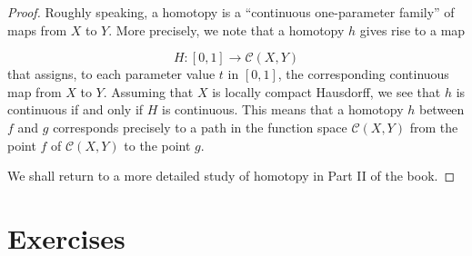 \begin{proof}
Roughly speaking, a homotopy is a ``continuous one-parameter family'' of maps from \(X\) to \(Y\). More precisely, we note that a homotopy \(h\) gives rise to a map

\[
H : [ {0,1}] \rightarrow \mathcal{C}({X,Y})
\]
that assigns, to each parameter value \(t\) in \([ {0,1}]\), the corresponding continuous map from \(X\) to \(Y\). Assuming that \(X\) is locally compact Hausdorff, we see that \(h\) is continuous if and only if \(H\) is continuous. This means that a homotopy \(h\) between \(f\) and \(g\) corresponds precisely to a path in the function space \(\mathcal{C}({X,Y})\) from the point \(f\) of \(\mathcal{C}({X,Y})\) to the point \(g\).

We shall return to a more detailed study of homotopy in Part II of the book.
\end{proof}
\section*{Exercises}
